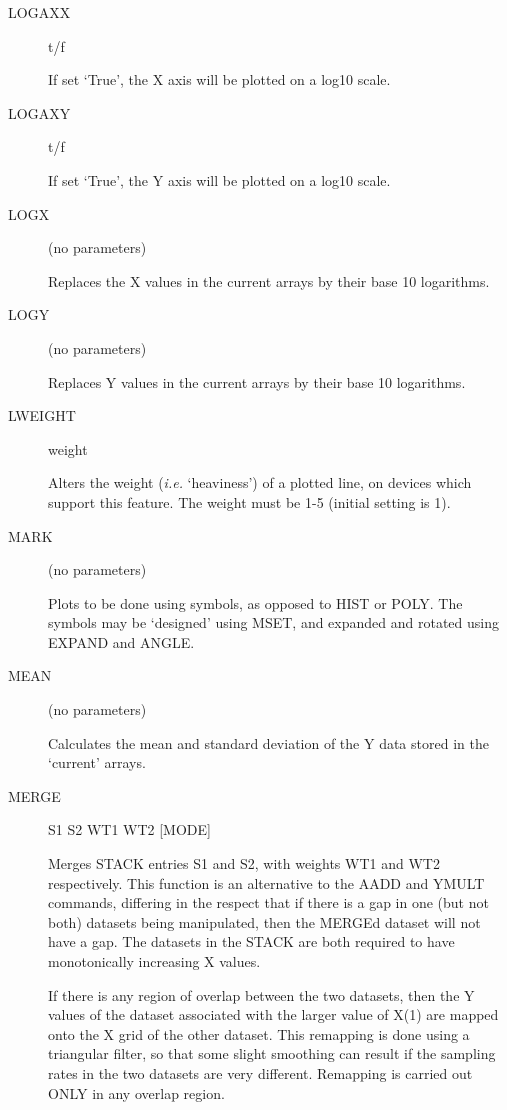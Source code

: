 \begin {description}
\item [LOGAXX] t/f

If set `True', the X axis will be plotted on a log10 scale.

\item [LOGAXY] t/f

If set `True', the Y axis will be plotted on a log10 scale.

\item [LOGX] (no parameters)

Replaces the X values in the current arrays by their base 10 logarithms.

\item [LOGY] (no parameters)

Replaces Y values in the current arrays by their base 10 logarithms.

\item [LWEIGHT] weight

Alters the weight ({\em i.e.} `heaviness') of a plotted line, on
devices which support this feature. The weight must be 1-5 (initial
setting is 1).

\item [MARK] (no parameters)

Plots to be done using symbols, as opposed to HIST or POLY. The
symbols may be `designed' using MSET, and expanded and rotated using
EXPAND and ANGLE.

\item [MEAN] (no parameters)

Calculates the mean and standard deviation of the Y data stored in the
`current' arrays.

\item [MERGE] S1 S2 WT1 WT2 [MODE]

Merges STACK entries S1 and S2, with weights WT1 and WT2 respectively.
This function is an alternative to the AADD and YMULT commands,
differing in the respect that if there is a gap in one (but not both)
datasets being manipulated, then the MERGEd dataset will not have a
gap. The datasets in the STACK are both required to have monotonically
increasing X values.

If there is any region of overlap between the two datasets, then the Y
values of the dataset associated with the larger value of X(1) are
mapped onto the X grid of the other dataset. This remapping is done
using a triangular filter, so that some slight smoothing can result if
the sampling rates in the two datasets are very different. Remapping
is carried out ONLY in any overlap region.


\end{description}

